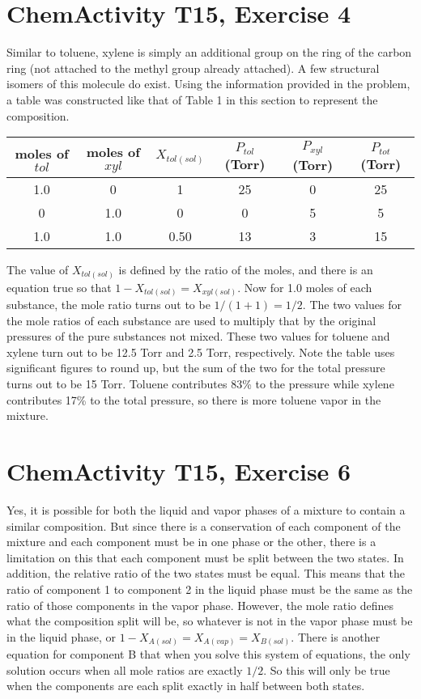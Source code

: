 \section{ChemActivity T15, Exercise 4}
Similar to toluene, xylene is simply an additional  group on the ring of the carbon ring (not attached to the methyl group already attached). A few structural isomers of this molecule do exist. Using the information provided in the problem, a table was constructed like that of Table 1 in this section to represent the composition.
\begin{center}
\begin{tabular}{c|c|c|c|c|c}
  moles of $tol$ & moles of $xyl$ & $X_{tol(sol)}$ & $P_{tol}$ (Torr) & $P_{xyl}$ (Torr) & $P_{tot}$ (Torr)	\\ \hline \hline
  1.0 & 0 & 1 & 25 & 0 & 25 \\ \hline
  0 & 1.0 & 0 & 0 & 5 & 5 \\ \hline
  1.0 & 1.0 & 0.50 & 13 & 3 & 15 \\
  \hline
\end{tabular}
\end{center}
The value of $X_{tol(sol)}$ is defined by the ratio of the moles, and there is an equation true so that $1 - X_{tol(sol)} = X_{xyl(sol)}$. Now for 1.0 moles of each substance, the mole ratio turns out to be $1 / (1 + 1) = 1/2$. The two values for the mole ratios of each substance are used to multiply that by the original pressures of the pure substances not mixed. These two values for toluene and xylene turn out to be 12.5 Torr and 2.5 Torr, respectively. Note the table uses significant figures to round up, but the sum of the two for the total pressure turns out to be 15 Torr. Toluene contributes 83\% to the pressure while xylene contributes 17\% to the total pressure, so there is more toluene vapor in the mixture.

\section{ChemActivity T15, Exercise 6}
Yes, it is possible for both the liquid and vapor phases of a mixture to contain a similar composition. But since there is a conservation of each component of the mixture and each component must be in one phase or the other, there is a limitation on this that each component must be split between the two states. In addition, the relative ratio of the two states must be equal. This means that the ratio of component 1 to component 2 in the liquid phase must be the same as the ratio of those components in the vapor phase. However, the mole ratio defines what the composition split will be, so whatever is not in the vapor phase must be in the liquid phase, or $1 - X_{A(sol)} = X_{A(vap)} = X_{B(sol)}$. There is another equation for component B that when you solve this system of equations, the only solution occurs when all mole ratios are exactly $1/2$. So this will only be true when the components are each split exactly in half between both states.

